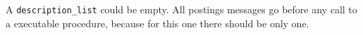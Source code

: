 A {\tt description\_list} could be empty. All postings
messages go before any call to a executable procedure, because for this
one there should be only one.